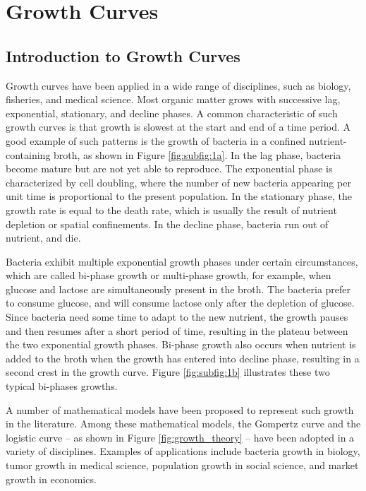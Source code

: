 \documentclass[conference]{IEEEtran}
\begin{document}
\section{Growth Curves}
\label{sec:growth}

\subsection{Introduction to Growth Curves}

Growth curves have been applied in a wide range of disciplines, such as biology, fisheries, and medical science. Most organic matter grows with successive lag, exponential, stationary, and decline phases. A common characteristic of such growth curves is that growth is slowest at the start and end of a time period. A good example of such patterns is the growth of bacteria in a confined nutrient-containing broth, as shown in Figure \ref{fig:subfig:1a}. In the lag phase, bacteria become mature but are not yet able to reproduce. The exponential phase is characterized by cell doubling, where the number of new bacteria appearing per unit time is proportional to the present population. In the stationary phase, the growth rate is equal to the death rate, which is usually the result of nutrient depletion or spatial confinements. In the decline phase, bacteria run out of nutrient, and die. 


Bacteria exhibit multiple exponential growth phases under certain circumstances, which are called bi-phase growth or multi-phase growth, for example, when glucose and lactose are simultaneously present in the broth. The bacteria prefer to consume glucose, and will consume lactose only after the depletion of glucose. Since bacteria need some time to adapt to the new nutrient, the growth pauses and then resumes after a short period of time, resulting in the plateau between the two exponential growth phases. Bi-phase growth also occurs when nutrient is added to the broth when the growth has entered into decline phase, resulting in a second crest in the growth curve. Figure \ref{fig:subfig:1b} illustrates these two typical bi-phases growths.

A number of mathematical models have been proposed to represent such growth in the literature. Among these mathematical models, the Gompertz curve \cite{c5} and the logistic curve \cite{c6} – as shown in Figure \ref{fig:growth_theory} – have been adopted in a variety of disciplines. Examples of applications include bacteria growth in biology, tumor growth in medical science, population growth in social science, and market growth in economics. 
\end{document}
